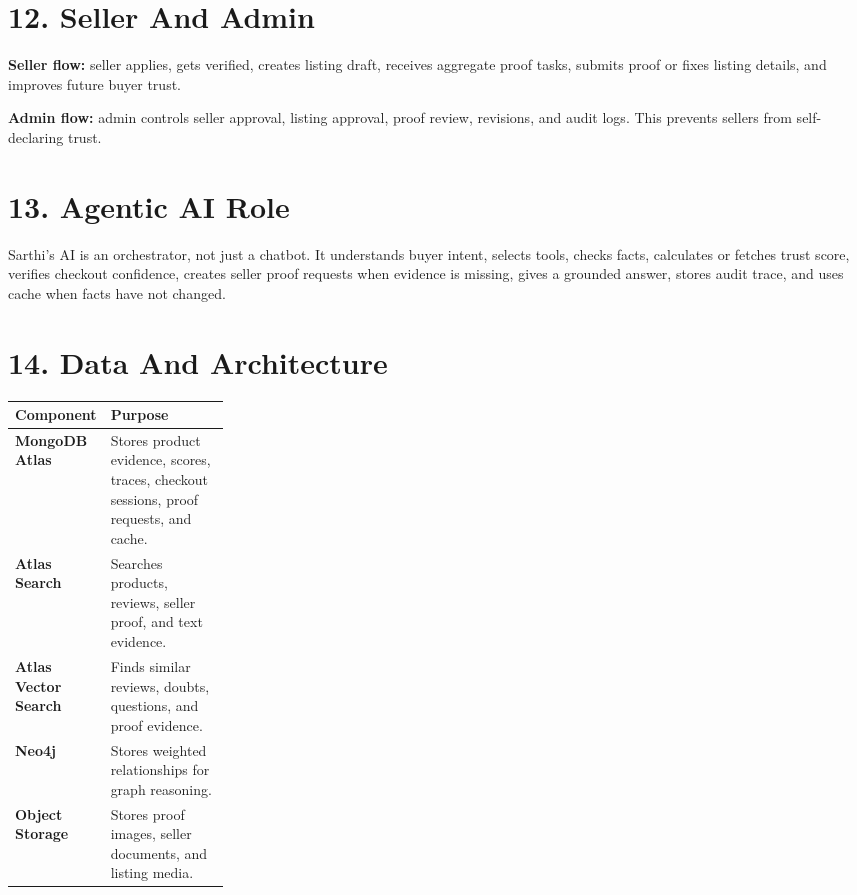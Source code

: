 \documentclass[11pt,a4paper,landscape]{article}
\begin{document}
\section{12. Seller And Admin}
\textbf{Seller flow:} seller applies, gets verified, creates listing draft, receives aggregate proof tasks, submits proof or fixes listing details, and improves future buyer trust.

\vspace{0.35em}
\textbf{Admin flow:} admin controls seller approval, listing approval, proof review, revisions, and audit logs. This prevents sellers from self-declaring trust.

\section{13. Agentic AI Role}
Sarthi's AI is an orchestrator, not just a chatbot. It understands buyer intent, selects tools, checks facts, calculates or fetches trust score, verifies checkout confidence, creates seller proof requests when evidence is missing, gives a grounded answer, stores audit trace, and uses cache when facts have not changed.

\section{14. Data And Architecture}
\begin{tabularx}{\linewidth}{>{\bfseries}p{0.25\linewidth}X}
\toprule
Component & Purpose\\
\midrule
MongoDB Atlas & Stores product evidence, scores, traces, checkout sessions, proof requests, and cache.\\
Atlas Search & Searches products, reviews, seller proof, and text evidence.\\
Atlas Vector Search & Finds similar reviews, doubts, questions, and proof evidence.\\
Neo4j & Stores weighted relationships for graph reasoning.\\
Object Storage & Stores proof images, seller documents, and listing media.\\
\bottomrule
\end{tabularx}
\end{document}
